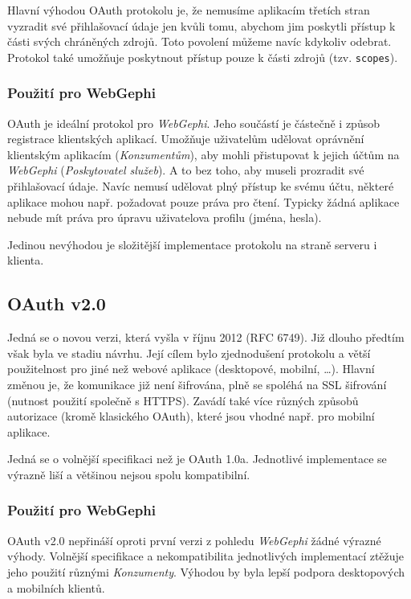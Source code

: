 \documentclass[thesis=M,czech]{FITthesis}[2014/05/6]
\begin{document}
Hlavní výhodou OAuth protokolu je, že nemusíme aplikacím třetích stran vyzradit své přihlašovací údaje jen kvůli tomu, abychom jim poskytli přístup k části svých chráněných zdrojů. Toto povolení můžeme navíc
kdykoliv odebrat. Protokol také umožňuje poskytnout přístup pouze k části zdrojů (tzv. \texttt{scopes}).

\subsubsection{Použití pro WebGephi}
OAuth je ideální protokol pro \textit{WebGephi}. Jeho součástí je částečně i způsob registrace klientských aplikací. Umožňuje uživatelům udělovat oprávnění klientským aplikacím (\textit{Konzumentům}), aby mohli 
přistupovat k jejich účtům na \textit{WebGephi} (\textit{Poskytovatel služeb}). A to bez toho, aby museli prozradit své přihlašovací údaje. Navíc nemusí udělovat plný přístup
ke svému účtu, některé aplikace mohou např. požadovat pouze práva pro čtení. Typicky žádná aplikace nebude mít práva pro úpravu uživatelova profilu (jména, hesla).

Jedinou nevýhodou je složitější implementace protokolu na straně serveru i klienta.

\subsection{OAuth v2.0\cite{oauth:v2}}
Jedná se o novou verzi, která vyšla v říjnu 2012 (RFC 6749). Již dlouho předtím však byla ve stadiu návrhu. Její cílem bylo zjednodušení protokolu
a větší použitelnost pro jiné než webové aplikace (desktopové, mobilní, \ldots). Hlavní změnou je, že komunikace již není šifrována, plně se spoléhá na SSL šifrování
(nutnost použití společně s HTTPS). Zavádí také více různých způsobů autorizace (kromě klasického  OAuth), které jsou vhodné např. pro mobilní aplikace.

Jedná se o volnější specifikaci než je OAuth 1.0a. Jednotlivé implementace se výrazně liší a většinou nejsou spolu kompatibilní.

\subsubsection{Použití pro WebGephi}
OAuth v2.0 nepřináší oproti první verzi z pohledu \textit{WebGephi} žádné výrazné výhody. Volnější specifikace a nekompatibilita jednotlivých implementací ztěžuje 
jeho použití různými \textit{Konzumenty}. Výhodou by byla lepší podpora desktopových a mobilních klientů. 
\end{document}

